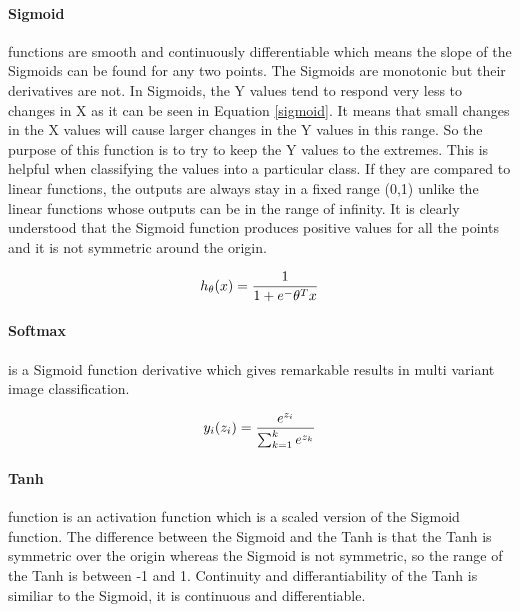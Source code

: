         \paragraph{Sigmoid} functions are smooth and continuously differentiable which means the slope of the Sigmoids can be found for any two points.
            The Sigmoids are monotonic but their derivatives are not.
            In Sigmoids, the Y values tend to respond very less to changes in X as it can be seen in Equation \eqref{sigmoid}.
            It means that small changes in the X values will cause larger changes in the Y values in this range.
            So the purpose of this function is to try to keep the Y values to the extremes.
            This is helpful when classifying the values into a particular class.
            If they are compared to linear functions, the outputs are always stay in a fixed range (0,1) unlike the linear functions whose outputs can be in the range of infinity.
            It is clearly understood that the Sigmoid function produces positive values for all the points and it is not symmetric around the origin.

            \begin{equation}
                h_ \theta (x) =  \frac{\mathrm{1} }{\mathrm{1} + e^- \theta^Tx } \label{sigmoid} \\
            \end{equation}

        \paragraph{Softmax} is a Sigmoid function derivative which gives remarkable results in multi variant image classification.

            \begin{equation}
                y_i(z_i) = \frac{e^{z_i}}{ \sum\nolimits_{k=1}^{k}{e^{z_k}} } \label{softmax} \\
            \end{equation}

        \paragraph{Tanh} function is an activation function which is a scaled version of the Sigmoid function.
            The difference between the Sigmoid and the Tanh is that the Tanh is symmetric over the origin whereas the Sigmoid is not symmetric, so the range of the Tanh is between -1 and 1.
            Continuity and differantiability of the Tanh is similiar to the Sigmoid, it is continuous and differentiable.

